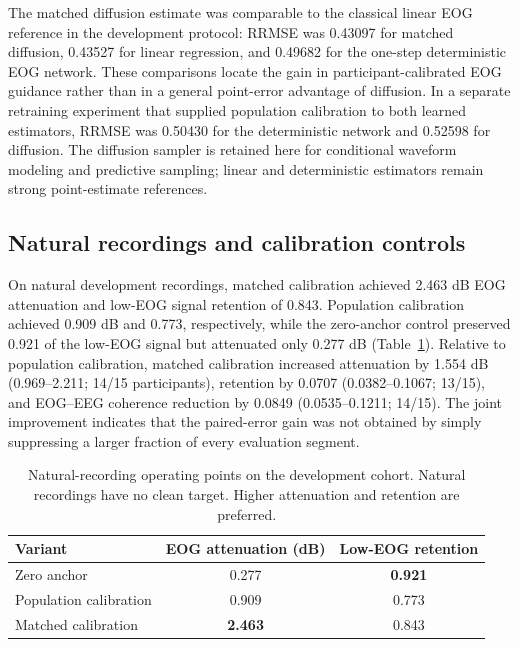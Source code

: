 The matched diffusion estimate was comparable to the classical linear EOG reference in the development protocol: RRMSE was 0.43097 for matched diffusion, 0.43527 for linear regression, and 0.49682 for the one-step deterministic EOG network. These comparisons locate the gain in participant-calibrated EOG guidance rather than in a general point-error advantage of diffusion. In a separate retraining experiment that supplied population calibration to both learned estimators, RRMSE was 0.50430 for the deterministic network and 0.52598 for diffusion. The diffusion sampler is retained here for conditional waveform modeling and predictive sampling; linear and deterministic estimators remain strong point-estimate references.

\subsection{Natural recordings and calibration controls}

On natural development recordings, matched calibration achieved 2.463 dB EOG attenuation and low-EOG signal retention of 0.843. Population calibration achieved 0.909 dB and 0.773, respectively, while the zero-anchor control preserved 0.921 of the low-EOG signal but attenuated only 0.277 dB (Table~\ref{tab:natural-results}). Relative to population calibration, matched calibration increased attenuation by 1.554 dB (0.969--2.211; 14/15 participants), retention by 0.0707 (0.0382--0.1067; 13/15), and EOG--EEG coherence reduction by 0.0849 (0.0535--0.1211; 14/15). The joint improvement indicates that the paired-error gain was not obtained by simply suppressing a larger fraction of every evaluation segment.

\begin{table}[t]
\caption{Natural-recording operating points on the development cohort. Natural recordings have no clean target. Higher attenuation and retention are preferred.}
\label{tab:natural-results}
\centering
\small
\begin{tabular}{@{}lcc@{}}
\toprule
Variant & EOG attenuation (dB) & Low-EOG retention \\
\midrule
Zero anchor & 0.277 & \textbf{0.921} \\
Population calibration & 0.909 & 0.773 \\
Matched calibration & \textbf{2.463} & 0.843 \\
\bottomrule
\end{tabular}
\end{table}

